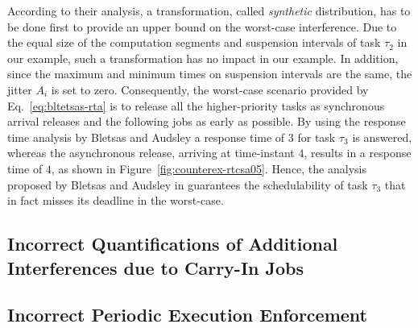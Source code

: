 According to their analysis, a transformation, called \emph{synthetic} distribution, has to be done first to provide an upper bound on the worst-case interference. 
Due to the equal size of the computation segments and suspension intervals of task $\tau_2$ in our example, such a transformation has no impact in our example. In addition, since the maximum and minimum times on suspension intervals are the same, the jitter $A_i$ is set to zero.
Consequently, the worst-case scenario provided by Eq.~\eqref{eq:bltetsas-rta} is to release all the higher-priority tasks as synchronous arrival releases and the following jobs as early as possible. By using the response time analysis by Bletsas and Audsley\cite{RTCSA-BletsasA05} a response time of $3$ for task $\tau_3$ is answered, whereas the asynchronous release, arriving at time-instant $4$, results in a response time of $4$, as shown in Figure~\ref{fig:counterex-rtcsa05}. Hence, the analysis proposed by Bletsas and Audsley in \cite{RTCSA-BletsasA05} guarantees the schedulability of task $\tau_3$ that in fact misses its deadline in the worst-case.

\subsection{Incorrect Quantifications of Additional Interferences due to Carry-In Jobs}
\label{sec:wrong-carryin}

\subsection{Incorrect Periodic Execution Enforcement}
\label{sec:wrong-periodic}





